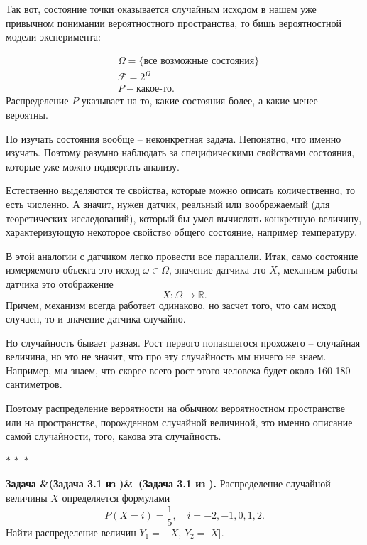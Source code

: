 \documentclass[a4paper,12pt]{article}
\newcommand{\R}{\mathbb{R}}
\newcommand{\threestars}{\begin{center}$ {\ast}\,{\ast}\,{\ast} $\end{center}}
\newcounter{th-counter}
\newcommand{\task}[1][]{%
  \par\noindent\textbf{Задача%
    \ifx&#1&\else\ #1\fi. }%
}
\begin{document}
Так вот, состояние точки оказывается случайным исходом в нашем уже привычном понимании вероятностного пространства, то бишь вероятностной модели эксперимента:

\begin{align*}
    &\Omega = \{ \text{все возможные состояния} \}\\
    &\mathcal{F} = 2^\Omega\\
    &P - \text{какое-то}.
\end{align*}
Распределение $P$ указывает на то, какие состояния более, а какие менее вероятны.

Но изучать состояния вообще -- неконкретная задача. Непонятно, что именно изучать. Поэтому разумно наблюдать за специфическими свойствами состояния, которые уже можно подвергать анализу.

Естественно выделяются те свойства, которые можно описать количественно, то есть численно. А значит, нужен датчик, реальный или воображаемый (для теоретических исследований), который бы умел вычислять конкретную величину, характеризующую некоторое свойство общего состояние, например температуру.

В этой аналогии с датчиком легко провести все параллели. Итак, само состояние измеряемого объекта это исход $\omega \in \Omega$, значение датчика это $X$, механизм работы датчика это отображение
\[
    X: \Omega \rightarrow \R.
\]
Причем, механизм всегда работает одинаково, но засчет того, что сам исход случаен, то и значение датчика случайно.

Но случайность бывает разная. Рост первого попавшегося прохожего -- случайная величина, но это не значит, что про эту случайность мы ничего не знаем. Например, мы знаем, что скорее всего рост этого человека будет около 160-180 сантиметров.

Поэтому распределение вероятности на обычном вероятностном пространстве или на пространстве, порожденном случайной величиной, это именно описание самой случайности, того, какова эта случайность.

\threestars

\task[(Задача 3.1 из \cite{ZubkovSevostyanovChistyakov1989})] Распределение случайной величины $X$ определяется формулами
\[
P(X=i) = \frac{1}{5}, \quad i = -2,-1,0,1,2.
\]
Найти распределение величин $Y_1 = -X$, $Y_2 = |X|$.
\end{document}
